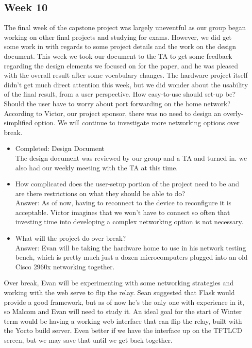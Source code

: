 \documentclass[letterpaper,10pt]{article}
\begin{document}
\subsection{Week 10}
The final week of the capstone project was largely uneventful as our group began working on other final projects 
and studying for exams. However, we did get some work in with regards to some project details and the work on the design document. 
This week we took our document to the TA to get some feedback regarding the design elements we focused on for the paper, 
and he was pleased with the overall result after some vocabulary changes. 
The hardware project itself didn't get much direct attention this week, but we did wonder about the usability of the final result, from a user perspective. 
How easy-to-use should set-up be? Should the user have to worry about port forwarding on the home network? 
According to Victor, our project sponsor, there was no need to design an overly-simplified option. 
We will continue to investigate more networking options over break.

\begin{itemize}
    \item Completed: Design Document\\
	The design document was reviewed by our group and a TA and turned in. 
	we also had our weekly meeting with the TA at this time.  
    \item How complicated does the user-setup portion of the project need
	to be and are there restrictions on what they should be able to do?\\
        Answer: As of now, having to reconnect to the device to reconfigure 
	it is acceptable. Victor imagines that we won't have to connect so
	often that investing time into developing a complex networking option
	is not necessary.
    \item What will the project do over break?\\
        Answer: Evan will be taking the hardware home to use in his network
	testing bench, which is pretty much just a dozen microcomputers 
	plugged into an old Cisco 2960x networking together. 
\end{itemize}

Over break, Evan will be experimenting with some networking strategies and
working with the web serve to flip the relay. Sean suggested that Flask would
provide a good framework, but as of now he's the only one with experience in 
it, so Malcom and Evan will need to study it. An ideal goal for the start of 
Winter term would be having a working web interface that can flip the relay,
built with the Yocto build server. Even better if we have the interface
up on the TFTLCD screen, but we may save that until we get back together.
\end{document}
